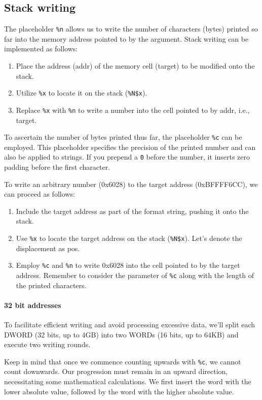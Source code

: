 \subsection{Stack writing}
The placeholder \texttt{\%n} allows us to write the number of characters (bytes) printed so far into the memory address pointed to by the argument.
Stack writing can be implemented as follows:
\begin{enumerate}
    \item Place the address (addr) of the memory cell (target) to be modified onto the stack.
    \item Utilize \texttt{\%x} to locate it on the stack (\texttt{\%N\$x}).
    \item Replace \texttt{\%x} with \texttt{\%n} to write a number into the cell pointed to by addr, i.e., target.
\end{enumerate}
To ascertain the number of bytes printed thus far, the placeholder \texttt{\%c} can be employed. 
This placeholder specifies the precision of the printed number and can also be applied to strings.
If you prepend a \texttt{0} before the number, it inserts zero padding before the first character.

To write an arbitrary number (0x6028) to the target address (0xBFFFF6CC), we can proceed as follows:
\begin{enumerate}
    \item Include the target address as part of the format string, pushing it onto the stack.
    \item Use \texttt{\%x} to locate the target address on the stack (\texttt{\%N\$x}). 
        Let's denote the displacement as pos.
    \item Employ \texttt{\%c} and \texttt{\%n} to write 0x6028 into the cell pointed to by the target address. 
        Remember to consider the parameter of \texttt{\%c} along with the length of the printed characters.
\end{enumerate}

\paragraph*{32 bit addresses}
To facilitate efficient writing and avoid processing excessive data, we'll split each DWORD (32 bits, up to 4GB) into two WORDs (16 bits, up to 64KB) and execute two writing rounds.

Keep in mind that once we commence counting upwards with \texttt{\%c}, we cannot count downwards. 
Our progression must remain in an upward direction, necessitating some mathematical calculations.
We first insert the word with the lower absolute value, followed by the word with the higher absolute value.

